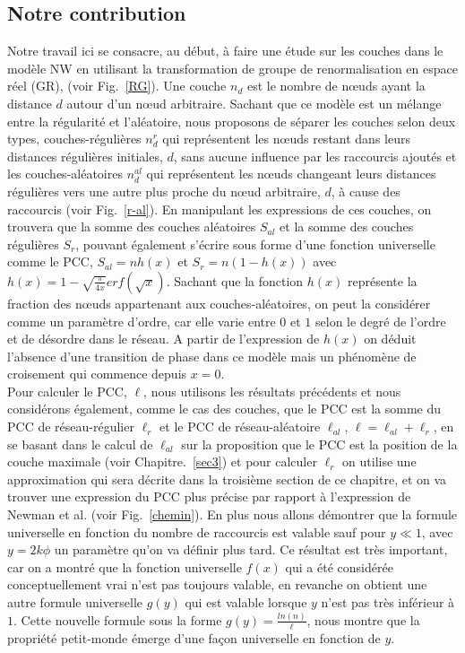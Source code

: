 \subsection{Notre contribution}
Notre travail ici se consacre, au début, à faire une étude sur les couches dans le modèle NW en utilisant la transformation de groupe de renormalisation en espace réel (GR), (voir Fig.~\ref{RG}). Une couche $n_d$ est le nombre de nœuds ayant la distance $d$ autour d'un nœud arbitraire. Sachant que ce modèle est un mélange entre la régularité et l'aléatoire,
nous proposons de séparer les couches selon deux types, couches-régulières $n_d^r$ qui représentent les nœuds restant dans leurs distances régulières initiales, $d$, sans aucune influence par les raccourcis ajoutés et les  couches-aléatoires $n_d^{al}$ qui représentent les nœuds changeant leurs distances régulières vers une autre 
plus proche du nœud arbitraire, $d$, à cause des raccourcis (voir Fig.~\ref{r-al}). En manipulant les expressions de ces couches, on trouvera que la somme des couches aléatoires $S_{al}$ et la somme des couches régulières $S_{r}$, pouvant également s'écrire sous  forme d'une fonction universelle comme le PCC, $S_{al}=nh(x)$ et $S_{r}=n(1-h(x))$ avec $h(x)=1-\sqrt{\frac{\pi}{4x}}erf(\sqrt{x})$. 
Sachant que la fonction $h(x)$ représente la fraction des nœuds appartenant aux couches-aléatoires, on peut la considérer comme un
paramètre d'ordre, car elle varie entre $0$ et $1$ selon le degré de l'ordre et de désordre dans le réseau. A partir de l'expression de $h(x)$ on déduit l'absence d'une transition de phase dans ce modèle mais un phénomène de croisement qui commence depuis $x=0$.\\

Pour calculer le PCC, $\ell$, 
nous utilisons les résultats précédents et nous considérons également, comme le cas des couches, que le PCC est la somme du PCC de réseau-régulier $\ell_{r}$ et le PCC de réseau-aléatoire  $\ell_{al}$, $\ell=\ell_{al}+\ell_r$, en se
 basant dans le calcul de $\ell_{al}$ sur la proposition que le PCC est la position de la couche maximale (voir Chapitre.~\ref{sec3}) et pour calculer $\ell_r$ on utilise une approximation qui sera décrite dans la troisième section de ce chapitre, et on va trouver une expression du PCC  plus précise par rapport à l'expression de Newman et al. (voir Fig.~\ref{chemin}).
En plus nous allons démontrer que la formule universelle en fonction du nombre de raccourcis est valable sauf pour $y\ll1$, avec $y=2k\phi$ un paramètre qu'on va définir plus tard. Ce résultat est très important, car on a montré que la fonction  universelle $f(x)$ qui a été considérée conceptuellement vrai n'est pas toujours valable, en revanche on obtient une autre formule universelle $g(y)$ qui est valable lorsque  $y$ n'est pas très inférieur à $1$. Cette nouvelle formule sous la forme $g(y)=\frac{ln(n)}{\ell}$, nous montre que la propriété petit-monde émerge d'une façon universelle en fonction de $y$.

